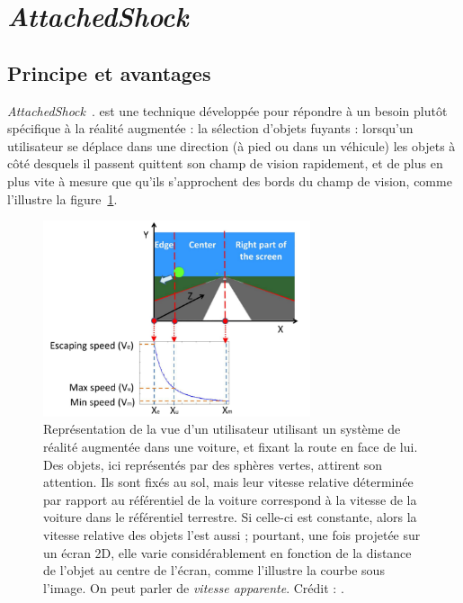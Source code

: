 \section{\emph{AttachedShock}}
	\subsection{Principe et avantages}
	\emph{AttachedShock}~\cite{you2012attachedshock, you2014attachedshock}. est une technique développée pour répondre à un besoin plutôt spécifique à la réalité augmentée : la sélection d'objets \og fuyants \fg{} : lorsqu'un utilisateur se déplace dans une direction (à pied ou dans un véhicule) les objets à côté desquels il passent quittent son champ de vision rapidement, et de plus en plus vite à mesure que qu'ils s'approchent des bords du champ de vision, comme l'illustre la figure~\ref{fig:as2dspeed}.
	
	\begin{figure}[!htb]
		\centering
		\includegraphics[width=0.70\textwidth]{figures/ch2/as2dspeed}
		\caption[\emph{AttachedShock}, profil de vitesse]{Représentation de la vue d'un utilisateur utilisant un système de réalité augmentée dans une voiture, et fixant la route en face de lui. Des objets, ici représentés par des sphères vertes, attirent son attention. Ils sont fixés au sol, mais leur vitesse relative déterminée par rapport au référentiel de la voiture correspond à la vitesse de la voiture dans le référentiel terrestre. Si celle-ci est constante, alors la vitesse relative des objets l'est aussi ; pourtant, une fois projetée sur un écran 2D, elle varie considérablement en fonction de la distance de l'objet au centre de l'écran, comme l'illustre la courbe sous l'image. On peut parler de \emph{vitesse apparente}. Crédit : \cite{you2012attachedshock}.}
		\label{fig:as2dspeed}
	\end{figure}
	
